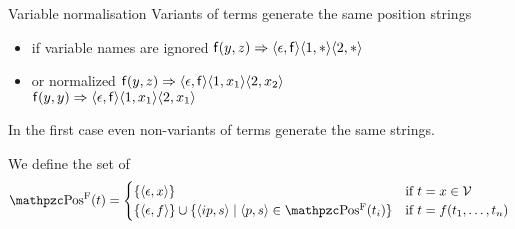 \begin{example}{Variable normalisation}
	Variants of terms generate the same position strings
	\begin{itemize}
		\item if variable names are ignored
		\hfill \( \mathsf{f}(y,z) \Rightarrow
		\langle\epsilon,\mathsf{f}\rangle
		\langle1,*\rangle
		\langle2,*\rangle
		 \)

		\item or normalized
		\hfill \( \mathsf{f}(y,z) \Rightarrow
		\langle\epsilon,\mathsf{f}\rangle
		\langle1,x_1\rangle
		\langle2,x_2\rangle \)
		\\
		\hfill \( \mathsf{f}(y,y) \Rightarrow
		\langle\epsilon,\mathsf{f}\rangle
		\langle1,x_1\rangle
		\langle2,x_1\rangle
		 \)
	\end{itemize}

	In the first case even non-variants of terms generate the same strings.
\end{example}


\begin{definition} We define the set of 
	\begin{gather*}
	\posS(t) =
	\begin{cases}
	\{ \ANGLES{\epsilon,x} \}
	& \text{if }t=x\in\SIGV \\
	\{ \ANGLES{\epsilon, f} \} \cup \{ \ANGLES{ip,s}\mid \ANGLES{p,s} \in\posS(t_i)\}
	&\text{if }t=f(t_1,\ldots,t_n)
	\end{cases}
	\end{gather*}
\end{definition}

